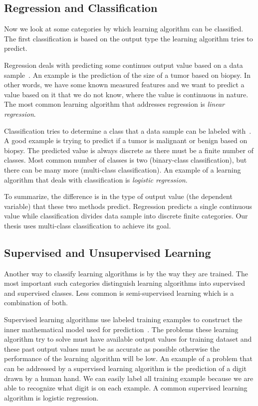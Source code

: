 \subsection{Regression and Classification}

Now we look at some categories by which learning algorithm can be classified. The first classification is based on the output type the learning algorithm tries to predict.

Regression deals with predicting some continues output value based on a data sample~\cite{worster2007understanding}. An example is the prediction of the size of a tumor based on biopsy. In other words, we have some known measured features and we want to predict a value based on it that we do not know, where the value is continuous in nature. The most common learning algorithm that addresses regression is \textit{linear regression}.

Classification tries to determine a class that a data sample can be labeled with~\cite{worster2007understanding}. A good example is trying to predict if a tumor is malignant or benign based on biopsy. The predicted value is always discrete as there must be a finite number of classes. Most common number of classes is two (binary-class classification), but there can be many more (multi-class classification). An example of a learning algorithm that deals with classification is \textit{logistic regression}.

To summarize, the difference is in the type of output value (the dependent variable) that these two methods predict. Regression predicts a single continuous value while classification divides data sample into discrete finite categories. Our thesis uses multi-class classification to achieve its goal.

\subsection{Supervised and Unsupervised Learning}

Another way to classify learning algorithms is by the way they are trained. The most important such categories distinguish learning algorithms into supervised and supervised classes. Less common is semi-supervised learning which is a combination of both.

Supervised learning algorithms use labeled training examples to construct the inner mathematical model used for prediction~\cite{donalek2014supervised}. The problems these learning algorithm try to solve must have available output values for training dataset and these past output values must be as accurate as possible otherwise the performance of the learning algorithm will be low. An example of a problem that can be addressed by a supervised learning algorithm is the prediction of a digit drawn by a human hand. We can easily label all training example because we are able to recognize what digit is on each example. A common supervised learning algorithm is logistic regression.

